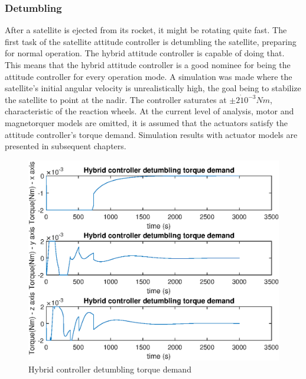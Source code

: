 


\subsubsection{Detumbling}

After a satellite is ejected from its rocket, it might be rotating quite fast. The first task of the satellite attitude controller is detumbling the satellite, preparing for normal operation. The hybrid attitude controller is capable of doing that. This means that the hybrid attitude controller is a good nominee for being the attitude controller for every operation mode. A simulation was made where the satellite's initial angular velocity is unrealistically high, the goal being to stabilize the satellite to point at the nadir. The controller saturates at $\pm 2 \dot 10^{-3} Nm$, characteristic of the reaction wheels. At the current level of analysis, motor and magnetorquer models are omitted, it is assumed that the actuators satisfy the attitude controller's torque demand. Simulation results with actuator models are presented in subsequent chapters.

\begin{figure}[H]
	\centering
	\includegraphics[width=0.7\linewidth]{figures/detumbling}
	\caption{Hybrid controller detumbling torque demand}
	\label{fig:detumbling}
\end{figure}

